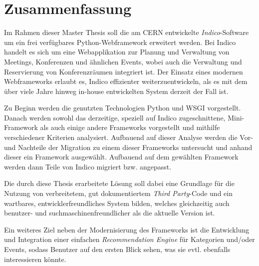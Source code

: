 \chapter*{Zusammenfassung}
\thispagestyle{empty}

Im Rahmen dieser Master Thesis soll die am CERN entwickelte \emph{Indico}-Software um ein frei
verfügbares Python-Webframework erweitert werden. Bei Indico handelt es sich um eine Webapplikation
zur Planung und Verwaltung von Meetings, Konferenzen und ähnlichen Events, wobei auch die Verwaltung
und Reservierung von Konferenzräumen integriert ist. Der Einsatz eines modernen Webframeworks
erlaubt es, Indico effizienter weiterzuentwickeln, als es mit dem über viele Jahre hinweg in-house
entwickelten System derzeit der Fall ist.

Zu Beginn werden die genutzten Technologien Python und WSGI vorgestellt. Danach werden sowohl
das derzeitige, speziell auf Indico zugeschnittene, Mini-Framework als auch einige andere
Frameworks vorgestellt und mithilfe verschiedener Kriterien analysiert. Aufbauend auf dieser Analyse
werden die Vor- und Nachteile der Migration zu einem dieser Frameworks untersucht und anhand dieser
ein Framework ausgewählt. Aufbauend auf dem gewählten Framework werden dann Teile von Indico
migriert bzw. angepasst.

Die durch diese Thesis erarbeitete Lösung soll dabei eine Grundlage für die Nutzung von
verbreitetem, gut dokumentiertem \emph{Third Party}-Code und ein wartbares, entwicklerfreundliches
System bilden, welches gleichzeitig auch benutzer- und suchmaschinenfreundlicher als die aktuelle
Version ist.

Ein weiteres Ziel neben der Modernisierung des Frameworks ist die Entwicklung und Integration einer
einfachen \emph{Recommendation Engine} für Kategorien und/oder Events, sodass Benutzer auf den
ersten Blick sehen, was sie evtl. ebenfalls interessieren könnte.
